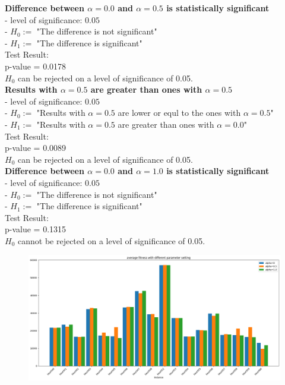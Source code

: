 \documentclass[a4paper,12pt]{article}
\begin{document}
\noindent
\textbf{Difference between $\alpha=0.0$ and $\alpha=0.5$ is statistically significant}\\
- level of significance: $0.05$\\
- $H_0:=$ "The difference is not significant"\\
- $H_1:=$ "The difference is significant"\\

\noindent
Test Result:\\
p-value = 0.0178\\
$H_0$ can be rejected on a level of significance of 0.05.\\

\noindent
\textbf{Results with $\alpha=0.5$ are greater than ones with $\alpha=0.5$}\\
- level of significance: $0.05$\\
- $H_0:=$ "Results with $\alpha=0.5$ are lower or equl to the ones with $\alpha=0.5$"\\
- $H_1:=$ "Results with $\alpha=0.5$ are greater than ones with $\alpha=0.0$"\\

\noindent
Test Result:\\
p-value = 0.0089\\
$H_0$ can be rejected on a level of significance of 0.05.\\

\noindent
\textbf{Difference between $\alpha=0.0$ and $\alpha=1.0$ is statistically significant}\\
- level of significance: $0.05$\\
- $H_0:=$ "The difference is not significant"\\
- $H_1:=$ "The difference is significant"\\

\noindent
Test Result:\\
p-value = 0.1315\\
$H_0$ cannot be rejected on a level of significance of 0.05.\\

\begin{figure}[H]
\centering
\includegraphics[width=17cm]{graphics/mean 3.png}
\end{figure}
\end{document}
